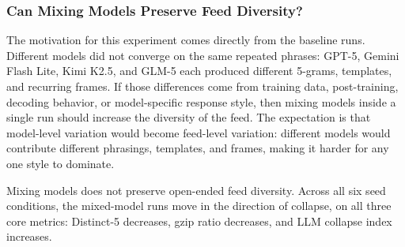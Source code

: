\documentclass[11pt]{article}
\begin{document}
\subsubsection{Can Mixing Models Preserve Feed Diversity?}
\label{subsubsec:mixing-models}

The motivation for this experiment comes directly from the baseline runs. Different models did not converge on the same repeated phrases: GPT-5, Gemini Flash Lite, Kimi K2.5, and GLM-5 each produced different 5-grams, templates, and recurring frames. If those differences come from training data, post-training, decoding behavior, or model-specific response style, then mixing models inside a single run should increase the diversity of the feed. The expectation is that model-level variation would become feed-level variation: different models would contribute different phrasings, templates, and frames, making it harder for any one style to dominate.

Mixing models does not preserve open-ended feed diversity. Across all six seed conditions, the mixed-model runs move in the direction of collapse, on all three core metrics: Distinct-5 decreases, gzip ratio decreases, and LLM collapse index increases.
\end{document}
